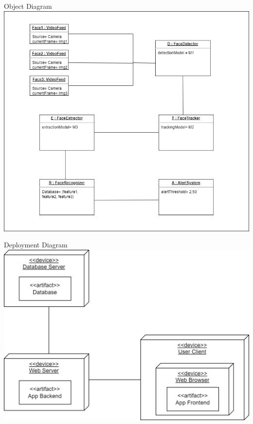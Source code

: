 \begin{frame}{Object Diagram}
	\centering
	\includegraphics[height=0.8\textheight]{components/images/object.png}
\end{frame}

\begin{frame}{Deployment Diagram}
	\centering
	\includegraphics[width=0.85 \textwidth]{components/images/deployment.jpeg}
\end{frame}